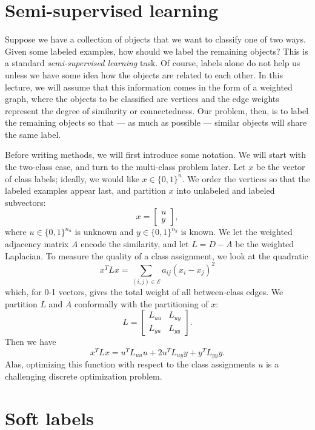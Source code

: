 \documentclass[12pt, leqno]{article} %
\begin{document}

\section{Semi-supervised learning}

Suppose we have a collection of objects that we want to classify
one of two ways.  Given some labeled examples, how should we label
the remaining objects?  This is a standard
{\em semi-supervised learning} task.  Of course, labels alone do
not help us unless we have some idea how the objects are related
to each other.  In this lecture, we will assume that this information
comes in the form of a weighted graph, where the objects to be
classified are vertices and the edge weights represent the
degree of similarity or connectedness.  Our problem, then,
is to label the remaining objects so that --- as much as possible ---
similar objects will share the same label.

Before writing methods, we will first introduce some notation.
We will start with the two-class case, and turn to the multi-class
problem later. Let $x$ be the vector of class labels; ideally, we would like
$x \in \{0,1\}^n$.  We order the vertices so that the labeled
examples appear last, and partition $x$ into unlabeled and labeled
subvectors:
\[
  x = \begin{bmatrix} u \\ y \end{bmatrix},
\]
where $u \in \{0,1\}^{n_u}$ is unknown and $y \in \{0,1\}^{n_y}$ is
known.  We let the weighted adjacency matrix $A$ encode the
similarity, and let $L = D-A$ be the weighted Laplacian.  To measure
the quality of a class assignment, we look at the quadratic
\[
  x^T L x
  = \sum_{(i,j) \in \mathcal{E}} a_{ij} (x_i-x_j)^2
\]
which, for 0-1 vectors, gives the total weight of all between-class
edges.  We partition $L$ and $A$ conformally with the partitioning
of $x$:
\[
  L = \begin{bmatrix} L_{uu} & L_{uy} \\ L_{yu} & L_{yy} \end{bmatrix}.
\]
Then we have
\[
  x^T L x = u^T L_{uu} u + 2 u^T L_{uy} y + y^T L_{yy} y.
\]
Alas, optimizing this function with respect to the class assignments $u$
is a challenging discrete optimization problem.

\section{Soft labels}
\end{document}
